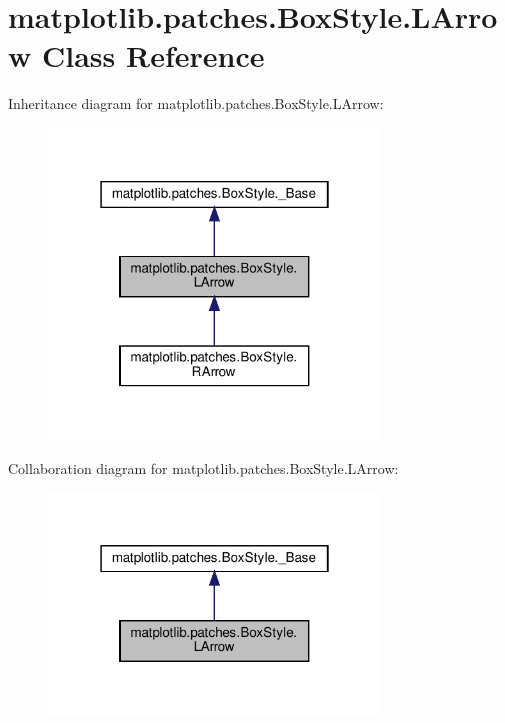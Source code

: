 \hypertarget{classmatplotlib_1_1patches_1_1BoxStyle_1_1LArrow}{}\section{matplotlib.\+patches.\+Box\+Style.\+L\+Arrow Class Reference}
\label{classmatplotlib_1_1patches_1_1BoxStyle_1_1LArrow}


Inheritance diagram for matplotlib.\+patches.\+Box\+Style.\+L\+Arrow\+:
\nopagebreak
\begin{figure}[H]
\begin{center}
\leavevmode
\includegraphics[width=250pt]{classmatplotlib_1_1patches_1_1BoxStyle_1_1LArrow__inherit__graph}
\end{center}
\end{figure}


Collaboration diagram for matplotlib.\+patches.\+Box\+Style.\+L\+Arrow\+:
\nopagebreak
\begin{figure}[H]
\begin{center}
\leavevmode
\includegraphics[width=250pt]{classmatplotlib_1_1patches_1_1BoxStyle_1_1LArrow__coll__graph}
\end{center}
\end{figure}
